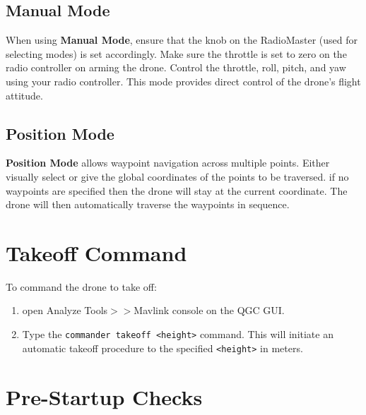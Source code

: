 \documentclass[12pt,a4paper]{article}
\begin{document}
\subsection{Manual Mode}
When using \textbf{Manual Mode}, ensure that the knob on the RadioMaster (used for selecting modes) is set accordingly. Make sure the throttle is set to zero on the radio controller on arming the drone. Control the throttle, roll, pitch, and yaw using your radio controller. This mode provides direct control of the drone’s flight attitude.

\subsection{Position Mode}
\textbf{Position Mode} allows waypoint navigation across multiple points. Either visually select or give the global coordinates of the points to be traversed. if no waypoints are specified then the drone will stay at the current coordinate. The drone will then automatically traverse the waypoints in sequence.

\section{Takeoff Command}
To command the drone to take off:
\begin{enumerate}
    \item open Analyze Tools$>>$Mavlink console on the QGC GUI.
    \item Type the \verb|commander takeoff <height>| command. This will initiate an automatic takeoff procedure to the specified \texttt{<height>} in meters.

\end{enumerate}

\section{Pre-Startup Checks}
\end{document}
